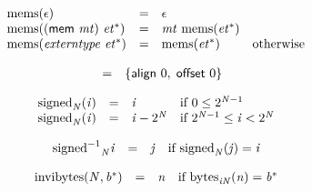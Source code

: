 $$
\begin{array}{@{}lcl@{}l@{}}
{\mathrm{mems}}(\epsilon) &=& \epsilon &  \\
{\mathrm{mems}}((\mathsf{mem}~{\mathit{mt}})~{{\mathit{et}}^\ast}) &=& {\mathit{mt}}~{\mathrm{mems}}({{\mathit{et}}^\ast}) &  \\
{\mathrm{mems}}({\mathit{externtype}}~{{\mathit{et}}^\ast}) &=& {\mathrm{mems}}({{\mathit{et}}^\ast}) &\quad
  \mbox{otherwise} \\
\end{array}
$$

\vspace{1ex}

\vspace{1ex}

$$
\begin{array}{@{}lcl@{}l@{}}
 &=& \{ \begin{array}[t]{@{}l@{}}
\mathsf{align}~0,\; \mathsf{offset}~0 \}\end{array} &  \\
\end{array}
$$

\vspace{1ex}

\vspace{1ex}

$$
\begin{array}{@{}lcl@{}l@{}}
{{\mathrm{signed}}}_{{\mathit{N}}}({\mathit{i}}) &=& {\mathit{i}} &\quad
  \mbox{if}~0 \leq {2^{{\mathit{N}} - 1}} \\
{{\mathrm{signed}}}_{{\mathit{N}}}({\mathit{i}}) &=& {\mathit{i}} - {2^{{\mathit{N}}}} &\quad
  \mbox{if}~{2^{{\mathit{N}} - 1}} \leq {\mathit{i}} < {2^{{\mathit{N}}}} \\
\end{array}
$$

$$
\begin{array}{@{}lcl@{}l@{}}
{{{{{\mathrm{signed}}^{{-1}}}}{}}_{{\mathit{N}}}}{{\mathit{i}}} &=& {\mathit{j}} &\quad
  \mbox{if}~{{\mathrm{signed}}}_{{\mathit{N}}}({\mathit{j}}) = {\mathit{i}} \\
\end{array}
$$

\vspace{1ex}

\vspace{1ex}

$$
\begin{array}{@{}lcl@{}l@{}}
{\mathrm{invibytes}}({\mathit{N}}, {{\mathit{b}}^\ast}) &=& {\mathit{n}} &\quad
  \mbox{if}~{{\mathrm{bytes}}}_{{{\mathit{i}}}{{\mathit{N}}}}({\mathit{n}}) = {{\mathit{b}}^\ast} \\
\end{array}
$$

